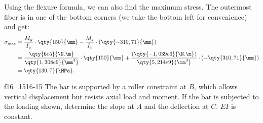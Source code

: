 \begin{derivation}
  Using the flexure formula, we can also find the maximum stress.
  The outermost fiber is in one of the bottom corners (we take the bottom left for convenience) and get:
  \begin{align*}
    \sigma_{\mathrm{max}} &= \frac{M_y}{I_y} \cdot \qty{150}{\mm} - \frac{M_z}{I_z} \cdot (\qty{-310,71}{\mm}) \\
    &= \frac{\qty{6e5}{\N.\m}}{\qty{1,308e9}{\mm^{4}} }\cdot \qty{150}{\mm} + \frac{(\qty{- 1,039e6}{\N.\m} )}{\qty{5,214e9}{\mm^{4}} } \cdot \left( - \qty{310,71}{\mm}  \right) \\
    &= \qty{130,7}{\MPa } 
  .\end{align*}
\end{derivation}


\begin{problemwithimage}{f16_15}{16-15}
  The bar is supported by a roller constraint at $B$, which allows vertical displacement but resists axial load and moment.
  If the bar is subjected to the loading shown, determine the slope at $A$ and the deflection at $C$.
  $EI$ is constant.
\end{problemwithimage}

